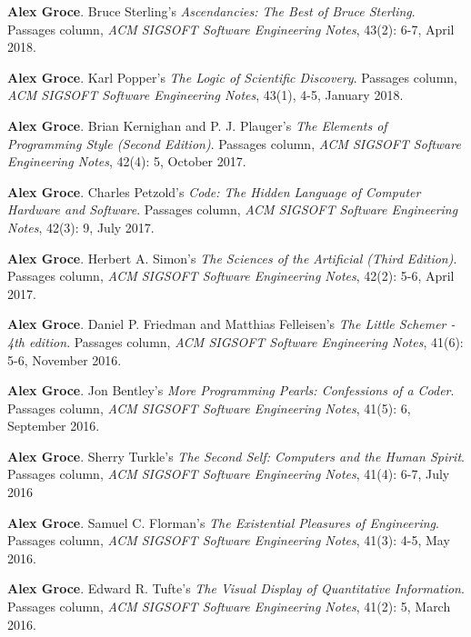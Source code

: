 \documentclass[ComputerScience]{vita}
\begin{document}
\begin{vita}
\begin{Columns, Book Reviews, and Magazine Articles}
\item {\bf Alex Groce}. 
\newblock Bruce Sterling's \emph{Ascendancies: The Best of Bruce Sterling}. 
\newblock Passages column, \emph{ACM SIGSOFT Software Engineering Notes}, 43(2): 6-7, April 2018.

\item {\bf Alex Groce}.
\newblock Karl Popper's \emph{The Logic of Scientific Discovery}.
\newblock Passages column, \emph{ACM SIGSOFT Software Engineering Notes}, 43(1), 4-5, January 2018.

\item {\bf Alex Groce}.
\newblock Brian Kernighan and P. J. Plauger's \emph{The Elements of Programming Style (Second Edition)}.
\newblock Passages column, \emph{ACM SIGSOFT Software Engineering Notes}, 42(4): 5, October 2017.

\item {\bf Alex Groce}.
\newblock Charles Petzold's \emph{Code: The Hidden Language of Computer Hardware and Software}.
\newblock Passages column, \emph{ACM SIGSOFT Software Engineering Notes}, 42(3): 9, July 2017.


\item {\bf Alex Groce}.
\newblock Herbert A. Simon's \emph{The Sciences of the Artificial (Third Edition)}.
\newblock Passages column, \emph{ACM SIGSOFT Software Engineering Notes}, 42(2): 5-6, April 2017.

\item {\bf Alex Groce}.
\newblock Daniel P. Friedman and Matthias Felleisen's \emph{The Little Schemer - 4th edition}.
\newblock Passages column, \emph{ACM SIGSOFT Software Engineering Notes}, 41(6): 5-6, November 2016.

\item {\bf Alex Groce}.
\newblock Jon Bentley's \emph{More Programming Pearls: Confessions of a Coder}.
\newblock Passages column, \emph{ACM SIGSOFT Software Engineering Notes}, 41(5): 6, September 2016.

\item {\bf Alex Groce}.
\newblock Sherry Turkle's \emph{The Second Self: Computers and the Human Spirit}.
\newblock Passages column, \emph{ACM SIGSOFT Software Engineering Notes}, 41(4): 6-7, July 2016

\item {\bf Alex Groce}.
\newblock Samuel C. Florman's \emph{The Existential Pleasures of Engineering}.
\newblock Passages column, \emph{ACM SIGSOFT Software Engineering Notes}, 41(3): 4-5, May 2016.


\item {\bf Alex Groce}.
\newblock Edward R. Tufte's \emph{The Visual Display of Quantitative Information}.
\newblock Passages column, \emph{ACM SIGSOFT Software Engineering Notes}, 41(2): 5, March 2016.


\end{Columns, Book Reviews, and Magazine Articles}
\end{vita}
\end{document}
